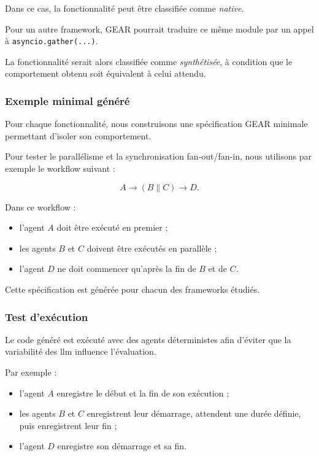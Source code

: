 Dans ce cas, la fonctionnalité peut être classifiée comme
\emph{native}.

Pour un autre framework, GEAR pourrait traduire ce même module par un
appel à \texttt{asyncio.gather(...)}.

La fonctionnalité serait alors classifiée comme \emph{synthétisée}, à
condition que le comportement obtenu soit équivalent à celui attendu.


\subsubsection{Exemple minimal généré}

Pour chaque fonctionnalité, nous construisons une spécification GEAR
minimale permettant d'isoler son comportement.

Pour tester le parallélisme et la synchronisation fan-out/fan-in, nous
utilisons par exemple le workflow suivant :

\begin{equation}
A
\longrightarrow
(B \parallel C)
\longrightarrow
D.
\label{eq:workflow-parallele}
\end{equation}

Dans ce workflow :

\begin{itemize}
    \item l'agent $A$ doit être exécuté en premier ;
    \item les agents $B$ et $C$ doivent être exécutés en parallèle ;
    \item l'agent $D$ ne doit commencer qu'après la fin de $B$ et de
    $C$.
\end{itemize}

Cette spécification est générée pour chacun des frameworks étudiés.


\subsubsection{Test d'exécution}

Le code généré est exécuté avec des agents déterministes afin d'éviter
que la variabilité des \gls{llm} influence l'évaluation.

Par exemple :

\begin{itemize}
    \item l'agent $A$ enregistre le début et la fin de son exécution ;
    \item les agents $B$ et $C$ enregistrent leur démarrage, attendent
    une durée définie, puis enregistrent leur fin ;
    \item l'agent $D$ enregistre son démarrage et sa fin.
\end{itemize}

